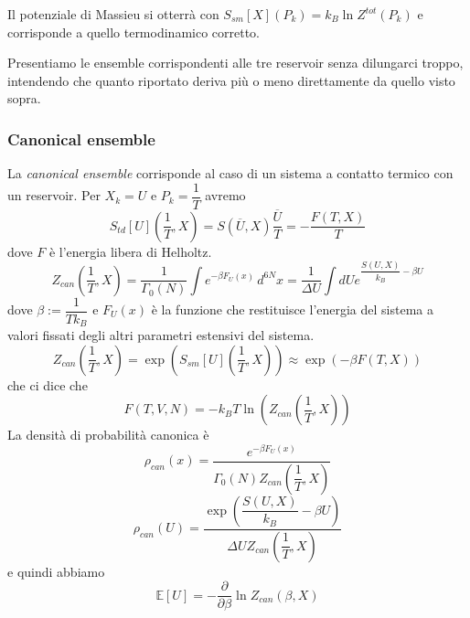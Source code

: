 \documentclass[11pt,a4paper,twoside]{book}
\numberwithin{equation}{section} %
\begin{document}
Il potenziale di Massieu si otterrà con $S_{sm}[X](P_k)=k_B\ln Z^{tot}(P_k)$ e corrisponde a quello termodinamico corretto.

Presentiamo le ensemble corrispondenti alle tre reservoir senza dilungarci troppo, intendendo che quanto riportato deriva più o meno direttamente da quello visto sopra.


\subsubsection{Canonical ensemble}
La \textit{canonical ensemble} corrisponde al caso di un sistema a contatto termico con un reservoir.
Per $X_k=U$ e $P_k=\dfrac{1}{T}$ avremo
\[
S_{td}[U](\dfrac{1}{T},X)=S(\overline{U},X)\dfrac{\overline{U}}{T}=-\dfrac{F(T,X)}{T}
\]
dove $F$ è l'energia libera di Helholtz.
\[
Z_{can}(\dfrac{1}{T},X)=\dfrac{1}{\Gamma_0(N)}\int e^{-\beta F_U(x)}\,d^{6N}x=\dfrac{1}{\Delta U}\int dU e^{\dfrac{S(U,X)}{k_B}-\beta U}
\]
dove $\beta:=\dfrac{1}{Tk_B}$ e $F_U(x)$ è la funzione che restituisce l'energia del sistema a valori fissati degli altri parametri estensivi del sistema.
\begin{equation}
Z_{can}(\dfrac{1}{T},X)=\exp{\left( S_{sm}[U](\dfrac{1}{T},X) \right)} \approx \exp{\left(-\beta F(T,X)\right)}
\end{equation}
che ci dice che
\begin{equation}
F(T,V,N)=-k_BT\ln\left(Z_{can}(\dfrac{1}{T},X)\right)
\end{equation}
La densità di probabilità canonica è
\begin{equation}
\rho_{can}(x)=\dfrac{e^{-\beta F_U(x)} }{\Gamma_0(N)Z_{can}(\dfrac{1}{T},X)}
\end{equation}
\[
\rho_{can}(U)=\dfrac{\exp{\left( \dfrac{S(U,X)}{k_B}-\beta U \right)}}{\Delta U Z_{can}(\dfrac{1}{T},X)}
\]
e quindi abbiamo
\[
\mathbb{E}[U]=-\dfrac{\partial}{\partial \beta}\ln Z_{can}(\beta, X)
\]
\end{document}

